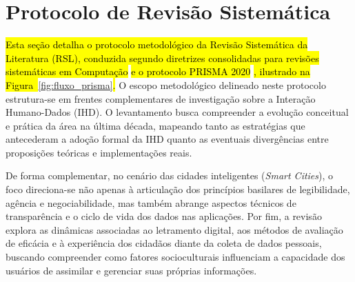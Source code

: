 \documentclass[
	12pt,				%
	oneside,			%
	a4paper,			%
	english,			%
	brazil				%
	]{abntex2ppgsi}
\newcommand{\hlciteonline}[1]{\colorbox{yellow}{\citeonline{#1}}} %
\begin{document}
 
    \section{Protocolo de Revisão Sistemática}

    \hl{Esta seção detalha o protocolo metodológico da Revisão Sistemática da Literatura (RSL), conduzida segundo diretrizes consolidadas para revisões sistemáticas em Computação}  \hl{e o protocolo PRISMA 2020} \hlciteonline{prisma2021}\hl{, ilustrado na Figura~}\ref{fig:fluxo_prisma}\hl{.} O escopo metodológico delineado neste protocolo estrutura-se em frentes complementares de investigação sobre a Interação Humano-Dados (IHD). O levantamento busca compreender a evolução conceitual e prática da área na última década, mapeando tanto as estratégias que antecederam a adoção formal da IHD quanto as eventuais divergências entre proposições teóricas e implementações reais.

    De forma complementar, no cenário das cidades inteligentes (\textit{Smart Cities}), o foco direciona-se não apenas à articulação dos princípios basilares de legibilidade, agência e negociabilidade, mas também abrange aspectos técnicos de transparência e o ciclo de vida dos dados nas aplicações. Por fim, a revisão explora as dinâmicas associadas ao letramento digital, aos métodos de avaliação de eficácia e à experiência dos cidadãos diante da coleta de dados pessoais, buscando compreender como fatores socioculturais influenciam a capacidade dos usuários de assimilar e gerenciar suas próprias informações.
    

\end{document}
